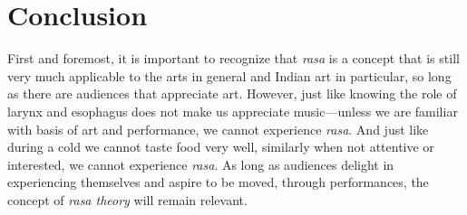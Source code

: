 \section*{Conclusion}

First and foremost, it is important to recognize that \textsl{rasa} is a concept that is still very much applicable to the arts in general and Indian art in particular, so long as there are audiences that appreciate art. However, just like knowing the role of larynx and esophagus does not make us appreciate music---unless we are familiar with basis of art and performance, we cannot experience \textsl{rasa}. And just like during a cold we cannot taste food very well, similarly when not attentive or interested, we cannot experience \textsl{rasa}. As long as audiences delight in experiencing themselves and aspire to be moved, through performances, the concept of \textsl{rasa theory} will remain relevant. 

